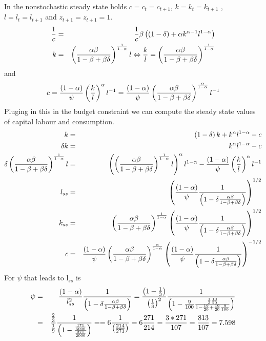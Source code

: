 \documentclass[a4paper,12pt]{article}
\begin{document}
In the nonstochastic steady state holds $c=c_{t}=c_{t+1}$, $k=k_{t}=k_{t+1}$%
, $l=l_{t}=l_{t+1}$ and $z_{t+1}=z_{t+1}=1.$ 
\begin{eqnarray*}
\frac{1}{c} &=&\frac{1}{c}\beta \left( \left( 1-\delta \right) +\alpha
k^{\alpha -1}l^{1-\alpha }\right)  \\
k &=&\left( \frac{\alpha \beta }{1-\beta +\beta \delta }\right) ^{\frac{1}{%
1-\alpha }}l\Leftrightarrow \frac{k}{l}=\left( \frac{\alpha \beta }{1-\beta
+\beta \delta }\right) ^{\frac{1}{1-\alpha }}
\end{eqnarray*}%
and 
\begin{equation*}
c=\frac{\left( 1-\alpha \right) }{\psi }\left( \frac{k}{l}\right) ^{\alpha
}l^{-1}=\frac{\left( 1-\alpha \right) }{\psi }\left( \frac{\alpha \beta }{%
1-\beta +\beta \delta }\right) ^{\frac{\alpha }{1-\alpha }}l^{-1}
\end{equation*}%
Pluging in this in the budget constraint we can compute the steady state
values of capital labour and consumption.%
\begin{eqnarray*}
k &=&\left( 1-\delta \right) k+k^{\alpha }l^{1-\alpha }-c \\
\delta k &=&k^{\alpha }l^{1-\alpha }-c \\
\delta \left( \frac{\alpha \beta }{1-\beta +\beta \delta }\right) ^{\frac{1}{%
1-\alpha }}l &=&\left( \left( \frac{\alpha \beta }{1-\beta +\beta \delta }%
\right) ^{\frac{1}{1-\alpha }}l\right) ^{\alpha }l^{1-\alpha }-\frac{\left(
1-\alpha \right) }{\psi }\left( \frac{k}{l}\right) ^{\alpha }l^{-1} \\
l_{ss} &=&\left( \frac{\left( 1-\alpha \right) }{\psi }\frac{1}{\left(
1-\delta \frac{\alpha \beta }{1-\beta +\beta \delta }\right) }\right) ^{1/2}
\\
k_{ss} &=&\left( \frac{\alpha \beta }{1-\beta +\beta \delta }\right) ^{\frac{%
1}{1-\alpha }}\left( \frac{\left( 1-\alpha \right) }{\psi }\frac{1}{\left(
1-\delta \frac{\alpha \beta }{1-\beta +\beta \delta }\right) }\right) ^{1/2}
\\
c &=&\frac{\left( 1-\alpha \right) }{\psi }\left( \frac{\alpha \beta }{%
1-\beta +\beta \delta }\right) ^{\frac{\alpha }{1-\alpha }}\left( \frac{%
\left( 1-\alpha \right) }{\psi }\frac{1}{\left( 1-\delta \frac{\alpha \beta 
}{1-\beta +\beta \delta }\right) }\right) ^{-1/2}
\end{eqnarray*}%
For $\psi $ that leads to l$_{ss}$ is%
\begin{eqnarray*}
\psi  &=&\frac{\left( 1-\alpha \right) }{l_{ss}^{2}}\frac{1}{\left( 1-\delta 
\frac{\alpha \beta }{1-\beta +\beta \delta }\right) }=\frac{\left( 1-\frac{1%
}{3}\right) }{\left( \frac{1}{3}\right) ^{2}}\frac{1}{\left( 1-\frac{9}{100}%
\frac{\frac{1}{3}\frac{19}{20}}{1-\frac{19}{20}+\frac{19}{20}\frac{9}{100}}%
\right) } \\
&=&\frac{\frac{2}{3}}{\frac{1}{9}}\frac{1}{\left( 1-\frac{\frac{171}{6000}}{%
\frac{271}{2000}}\right) }==6\frac{1}{\left( \frac{214}{271}\right) }=6\frac{%
271}{214}=\frac{3\ast 271}{107}=\frac{813}{107}=7.598
\end{eqnarray*}
\end{document}

